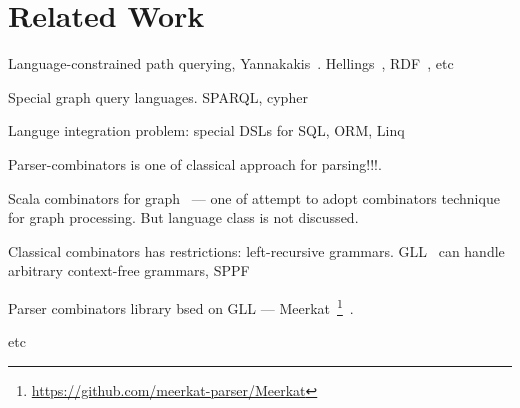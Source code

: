 \section{Related Work}

Language-constrained path querying, Yannakakis~\cite{Yannakakis}. 
Hellings~\cite{ConjCFPathQuery, Hellings16}, RDF~\cite{CFGonRDF}, etc~\cite{QueryGraphWithData, RegularDBQuery, GraphQueryWithEarley, FLCpathProblem, graphDB}

Special graph query languages. SPARQL, cypher

Languge integration problem: special DSLs for SQL, ORM, Linq

Parser-combinators is one of classical approach for parsing!!!.

Scala combinators for graph~\cite{ScalaGraphParsing} --- one of attempt to adopt combinators 
technique for graph processing.
But language class is not discussed.

Classical combinators has restrictions: left-recursive grammars.
GLL~\cite{scott2010gll} can handle arbitrary context-free grammars, SPPF~\cite{SPPF}

Parser combinators library bsed on GLL --- 
Meerkat~\footnote{\url{https://github.com/meerkat-parser/Meerkat}}~\cite{Meerkat}.

etc

